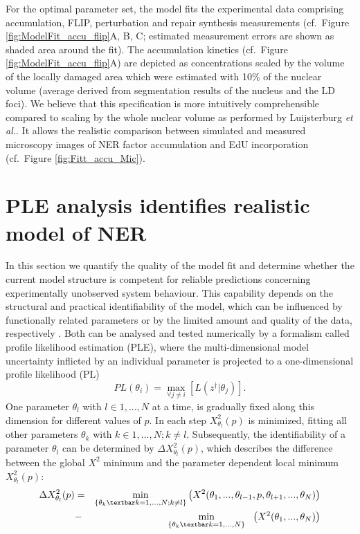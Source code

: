 For the optimal parameter set, the model fits the experimental data comprising accumulation, FLIP, perturbation and repair synthesis measurements (cf.\ Figure \ref{fig:ModelFit_accu_flip}A, B, C; estimated measurement errors are shown as shaded area around the fit). The accumulation kinetics (cf.\ Figure \ref{fig:ModelFit_accu_flip}A) are depicted as concentrations scaled by the volume of the locally damaged area which were estimated with 10\% of the nuclear volume (average derived from segmentation results of the nucleus and the LD foci). We believe that this specification is more intuitively comprehensible  compared to scaling by the whole nuclear volume as performed by Luijsterburg \textit{et al.}\cite{Luijsterburg2010}. It allows the realistic comparison between simulated and measured microscopy images of NER factor accumulation and EdU incorporation (cf.\ Figure \ref{fig:Fitt_accu_Mic}).  



\section{PLE analysis identifies realistic model of NER}
\label{sec:identifiabilityAnalysis}
In this section we quantify the quality of the model fit and determine whether the current model structure is competent for reliable predictions concerning experimentally unobserved system behaviour. This capability depends on the structural and practical identifiability of the model, which can be influenced by functionally related parameters or by the limited amount and quality of the data, respectively \cite{Cobelli1980,Swameye2003}. Both can be analysed and tested numerically by a formalism called profile likelihood estimation (PLE)\cite{Venzon1988,Murphy2000,Raue2009}, where the multi-dimensional model uncertainty inflicted by an individual parameter is projected to a one-dimensional profile likelihood (PL)
\begin{equation}
PL(\theta_i) = \max_{\forall j \neq i} [L(z^\dag \lvert \theta_j)].
\label{eqn:PL} 
\end{equation}
One parameter $\theta_l$ with $l\in{1,...,N}$ at a time, is gradually fixed along this dimension for different values of $p$. In each step $X_{\theta_l}^2(p)$ is minimized, fitting all other parameters $\theta_k$ with $k\in{1,...,N};k\neq l$. Subsequently, the identifiability of a parameter $\theta_l$ can be determined by $\Delta X_{\theta_l}^2(p)$, which describes the difference between the global $X^2$ minimum and the parameter dependent local minimum $X_{\theta_l}^2(p)$:
\begin{eqnarray}
	\Delta X_{\theta_l}^2(p) &=& \min_{\{\theta_k\textbar k=1,...,N;k\neq l\}} \left( X^2 (\theta_1,...,\theta_{l-1},p,\theta_{l+1},...,\theta_N )\right)\nonumber \\
	&-& \quad \! \min_{\{\theta_k\textbar k=1,...,N\}} \quad \!\! \left( X^2 (\theta_1,...,\theta_N )\right)
\end{eqnarray}  

